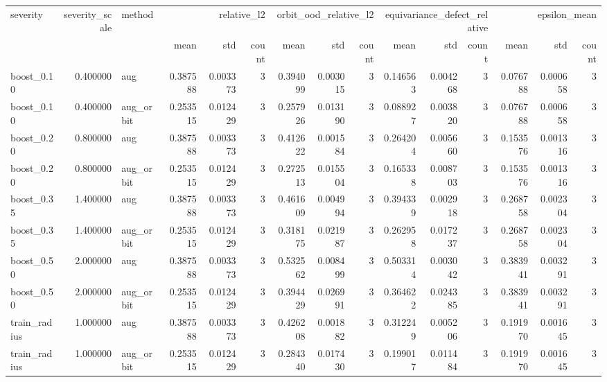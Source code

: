 \begin{tabular}{lrlrrrrrrrrrrrr}
\toprule
severity & severity_scale & method & \multicolumn{3}{r}{relative_l2} & \multicolumn{3}{r}{orbit_ood_relative_l2} & \multicolumn{3}{r}{equivariance_defect_relative} & \multicolumn{3}{r}{epsilon_mean} \\
 &  &  & mean & std & count & mean & std & count & mean & std & count & mean & std & count \\
\midrule
boost_0.10 & 0.400000 & aug & 0.387588 & 0.003373 & 3 & 0.394099 & 0.003015 & 3 & 0.146563 & 0.004268 & 3 & 0.076788 & 0.000658 & 3 \\
boost_0.10 & 0.400000 & aug_orbit & 0.253515 & 0.012429 & 3 & 0.257926 & 0.013190 & 3 & 0.088927 & 0.003820 & 3 & 0.076788 & 0.000658 & 3 \\
boost_0.20 & 0.800000 & aug & 0.387588 & 0.003373 & 3 & 0.412622 & 0.001584 & 3 & 0.264204 & 0.005660 & 3 & 0.153576 & 0.001316 & 3 \\
boost_0.20 & 0.800000 & aug_orbit & 0.253515 & 0.012429 & 3 & 0.272513 & 0.015504 & 3 & 0.165338 & 0.008703 & 3 & 0.153576 & 0.001316 & 3 \\
boost_0.35 & 1.400000 & aug & 0.387588 & 0.003373 & 3 & 0.461609 & 0.004994 & 3 & 0.394339 & 0.002918 & 3 & 0.268758 & 0.002304 & 3 \\
boost_0.35 & 1.400000 & aug_orbit & 0.253515 & 0.012429 & 3 & 0.318175 & 0.021987 & 3 & 0.262958 & 0.017237 & 3 & 0.268758 & 0.002304 & 3 \\
boost_0.50 & 2.000000 & aug & 0.387588 & 0.003373 & 3 & 0.532562 & 0.008499 & 3 & 0.503314 & 0.003042 & 3 & 0.383941 & 0.003291 & 3 \\
boost_0.50 & 2.000000 & aug_orbit & 0.253515 & 0.012429 & 3 & 0.394429 & 0.026991 & 3 & 0.364622 & 0.024385 & 3 & 0.383941 & 0.003291 & 3 \\
train_radius & 1.000000 & aug & 0.387588 & 0.003373 & 3 & 0.426208 & 0.001882 & 3 & 0.312249 & 0.005206 & 3 & 0.191970 & 0.001645 & 3 \\
train_radius & 1.000000 & aug_orbit & 0.253515 & 0.012429 & 3 & 0.284340 & 0.017430 & 3 & 0.199017 & 0.011484 & 3 & 0.191970 & 0.001645 & 3 \\
\bottomrule
\end{tabular}
